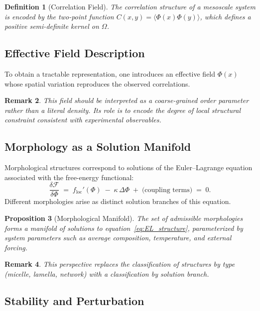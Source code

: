 \documentclass[11pt, a4paper, twocolumn]{article}
\newtheorem{definition}{Definition}[section]
\newtheorem{proposition}[definition]{Proposition}
\newtheorem{remark}[definition]{Remark}
\newcommand{\F}{\mathcal{F}}
\begin{document}
\begin{definition}[Correlation Field]
The correlation structure of a mesoscale system is encoded by the two-point
function $C(x,y) = \langle \Phi(x)\Phi(y) \rangle$, which defines a positive
semi-definite kernel on $\Omega$.
\end{definition}

\subsection{Effective Field Description}

To obtain a tractable representation, one introduces an effective field
$\Phi(x)$ whose spatial variation reproduces the observed correlations.

\begin{remark}
This field should be interpreted as a coarse-grained order parameter rather
than a literal density. Its role is to encode the degree of local structural
constraint consistent with experimental observables.
\end{remark}

\subsection{Morphology as a Solution Manifold}

Morphological structures correspond to solutions of the Euler--Lagrange
equation associated with the free-energy functional:
\begin{equation}
    \frac{\delta \F}{\delta \Phi}
    \;=\;
    f_{\mathrm{loc}}'(\Phi)
    \;-\;
    \kappa\,\Delta \Phi
    \;+\;
    \text{(coupling terms)} \;=\; 0.
    \label{eq:EL_structure}
\end{equation}
Different morphologies arise as distinct solution branches of this equation.

\begin{proposition}[Morphological Manifold]
The set of admissible morphologies forms a manifold of solutions to
equation~\eqref{eq:EL_structure}, parameterized by system parameters such as
average composition, temperature, and external forcing.
\end{proposition}

\begin{remark}
This perspective replaces the classification of structures by type (micelle,
lamella, network) with a classification by solution branch.
\end{remark}

\subsection{Stability and Perturbation}
\end{document}
